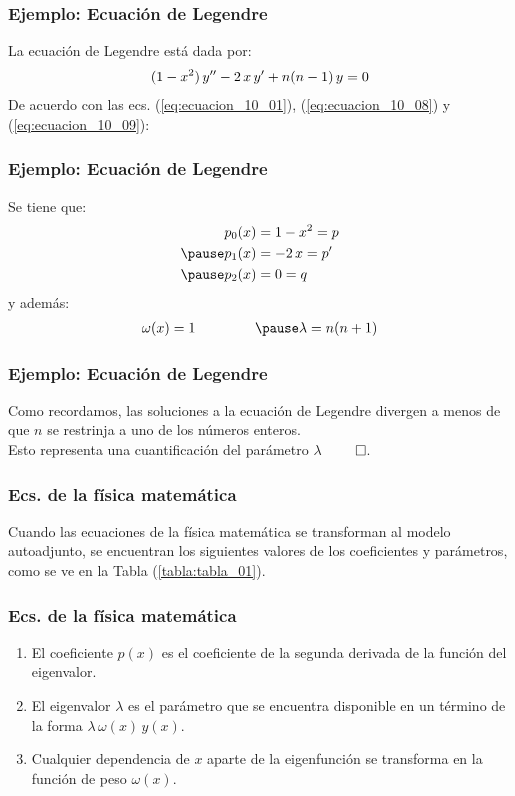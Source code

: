\documentclass[12pt]{beamer}
\begin{document}
\begin{frame}
\frametitle{Ejemplo: Ecuación de Legendre}
La ecuación de Legendre está dada por:
\pause
\begin{align}
(1 - x^{2}) \, {y}^{\prime \prime} - 2 \, x \, {y}^{\prime} +  n(n -1) \, y = 0
\label{eq:ecuacion_10_09}
\end{align}
De acuerdo con las ecs. (\ref{eq:ecuacion_10_01}), (\ref{eq:ecuacion_10_08}) y (\ref{eq:ecuacion_10_09}):
\end{frame}
\begin{frame}
\frametitle{Ejemplo: Ecuación de Legendre}
Se tiene que:
\pause
\begin{eqnarray*}
\begin{aligned}
p_{0} (x) &= 1 - x^{2} = p \\ \pause
p_{1} (x) &= -2 \, x = \pderivada{p} \\ \pause
p_{2} (x) &= 0 = q
\end{aligned}
\end{eqnarray*}
y además:
\pause
\begin{eqnarray*}
\omega (x) = 1 \hspace{1.5cm} \pause \lambda = n (n + 1)
\end{eqnarray*}
\end{frame}
\begin{frame}
\frametitle{Ejemplo: Ecuación de Legendre}
Como recordamos, las soluciones a la ecuación de Legendre divergen a menos de que $n$ se restrinja a uno de los números enteros.
\\
\bigskip
\pause
Esto representa una cuantificación del parámetro $\lambda$ $\qed$.
\end{frame}
\begin{frame}
\frametitle{Ecs. de la física matemática}
Cuando las ecuaciones de la física matemática se transforman al modelo autoadjunto, se encuentran los siguientes valores de los coeficientes y parámetros, como se ve en la Tabla (\ref{tabla:tabla_01}).
\end{frame}
\begin{frame}
\frametitle{Ecs. de la física matemática}
\begin{enumerate}[<+->]
\item El coeficiente $p (x)$ es el coeficiente de la segunda derivada de la función del eigenvalor.
\item El eigenvalor $\lambda$ es el parámetro que se encuentra disponible en un término de la forma $\lambda \, \omega (x) \, y (x)$.
\item Cualquier dependencia de $x$ aparte de la eigenfunción se transforma en la función de peso $\omega (x)$.
\end{enumerate}
\end{frame}
\end{document}
